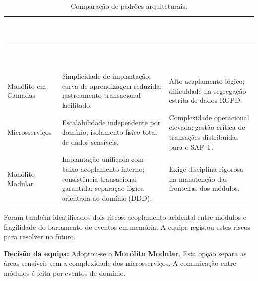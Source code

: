 \begin{center}
{\small
{}
\begin{xltabular}{\textwidth}{|>{\raggedright\arraybackslash}p{3.5cm}|>{\raggedright\arraybackslash}X|>{\raggedright\arraybackslash}X|}
\hline
{}\textcolor{white}{\textbf{Opção Arquitetural}} & \textcolor{white}{\textbf{Vantagens}} & \textcolor{white}{\textbf{Desvantagens}} \\ \hline
\endfirsthead

 \\
\hline
{}\textcolor{white}{\textbf{Opção Arquitetural}} & \textcolor{white}{\textbf{Vantagens}} & \textcolor{white}{\textbf{Desvantagens}} \\ \hline
\endhead

\hline {} \\ \hline \endfoot

\hline
\caption{Comparação de padrões arquiteturais.}
\label{tab:comparacao_padroes_arq} \\
\endlastfoot

Monólito em Camadas & Simplicidade de implantação; curva de aprendizagem reduzida; rastreamento transacional facilitado. & Alto acoplamento lógico; dificuldade na segregação estrita de dados RGPD. \\ \hline
Microsserviços & Escalabilidade independente por domínio; isolamento físico total de dados sensíveis. & Complexidade operacional elevada; gestão crítica de transações distribuídas para o SAF-T. \\ \hline
Monólito Modular & Implantação unificada com baixo acoplamento interno; consistência transacional garantida; separação lógica orientada ao domínio (DDD). & Exige disciplina rigorosa na manutenção das fronteiras dos módulos. \\ \hline
\end{xltabular}
}
\end{center}

Foram também identificados dois riscos: acoplamento acidental entre módulos e fragilidade do barramento de eventos em memória. A equipa registou estes riscos para resolver no futuro.

\textbf{Decisão da equipa:} Adoptou-se o \textbf{Monólito Modular}. Esta opção separa as áreas sensíveis sem a complexidade dos microsserviços. A comunicação entre módulos é feita por eventos de domínio.

